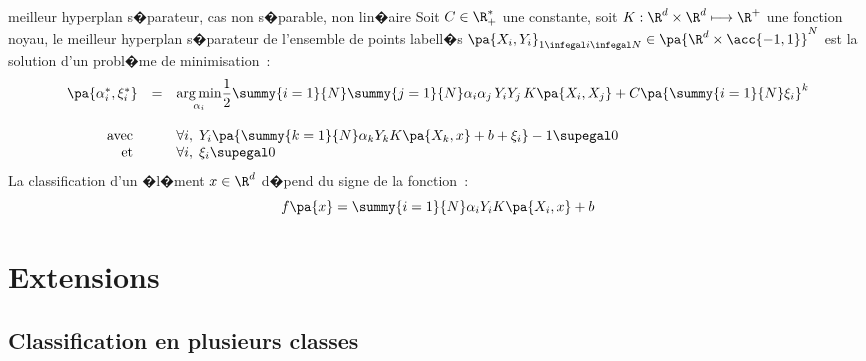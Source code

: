            \begin{xproblem}{meilleur hyperplan s�parateur, cas non s�parable, non lin�aire}\label{svm_problem_def_4}
            Soit $C \in \R^*_+$ une constante, soit $K : \R^d \times \R^d \longmapsto \R^+$ une fonction noyau,
            le meilleur hyperplan s�parateur de l'ensemble de points labell�s
            $\pa{X_i,Y_i}_{1 \infegal i \infegal N} \in \pa{ \R^d \times \acc{-1,1} }^N$ est la solution
            d'un probl�me de minimisation~: 
                    $$
                    \begin{array}{rcl}    \pa{\alpha_i^*, \xi_i^*} &=& \underset{\alpha_i}{\arg \min} \dfrac{1}{2}  
                                                                                    \summy{i=1}{N}\summy{j=1}{N}
                                                                                            \alpha_i \alpha_j \,
                                                                                            Y_i Y_j \,
                                                                                            K\pa{X_i,X_j}
                                                                                    + C \pa{\summy{i=1}{N} \xi_i}^k \\ \\
                                         \text{avec }      && \forall i, \;  Y_i \pa{ \summy{k=1}{N} \alpha_k Y_k K\pa{X_k,x} + b + \xi_i } - 1 \supegal 0 \\
                                         \text{et }            && \forall i, \; \xi_i \supegal 0 
                    \end{array}                                        
                    $$
            La classification d'un �l�ment $x \in \R^d$ d�pend du signe de la fonction~:
                    $$
                    f\pa{x} = \summy{i=1}{N} \alpha_i Y_i K\pa{X_i,x} + b
                    $$
            \end{xproblem}
            
            
\section{Extensions}

\subsection{Classification en plusieurs classes}

